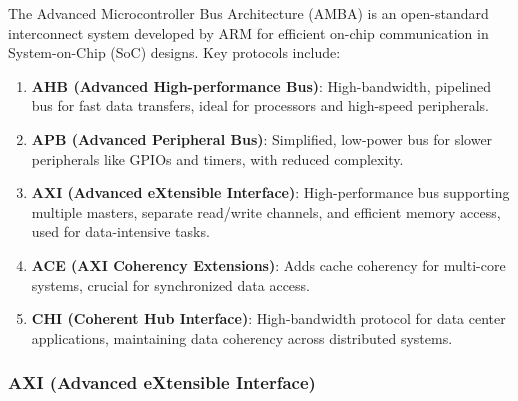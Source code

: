 The Advanced Microcontroller Bus Architecture (AMBA) is an open-standard
interconnect system developed by ARM for efficient on-chip communication
in System-on-Chip (SoC) designs. Key protocols include:

\begin{enumerate}
\def\labelenumi{\arabic{enumi}.}
\item
  \textbf{AHB (Advanced High-performance Bus)}: High-bandwidth,
  pipelined bus for fast data transfers, ideal for processors and
  high-speed peripherals.
\item
  \textbf{APB (Advanced Peripheral Bus)}: Simplified, low-power bus for
  slower peripherals like GPIOs and timers, with reduced complexity.
\item
  \textbf{AXI (Advanced eXtensible Interface)}: High-performance bus
  supporting multiple masters, separate read/write channels, and
  efficient memory access, used for data-intensive tasks.
\item
  \textbf{ACE (AXI Coherency Extensions)}: Adds cache coherency for
  multi-core systems, crucial for synchronized data access.
\item
  \textbf{CHI (Coherent Hub Interface)}: High-bandwidth protocol for
  data center applications, maintaining data coherency across
  distributed systems.
\end{enumerate}

\hypertarget{axi-advanced-extensible-interface}{%
\subsubsection{AXI (Advanced eXtensible
Interface)}\label{axi-advanced-extensible-interface}}

